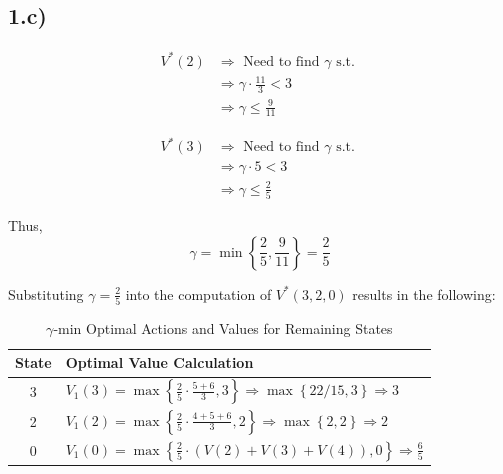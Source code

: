 \documentclass[11pt]{article}
\begin{document}
\subsection*{1.c)}

\begin{align*}
V^*(2) &\Rightarrow \text{ Need to find } \gamma \text{ s.t. } \\
& \Rightarrow \gamma \cdot \frac{11}{3} < 3 \\
&\Rightarrow \gamma \leq \frac{9}{11}
\end{align*}

\vspace{1em}

\begin{align*}
V^*(3) &\Rightarrow \text{ Need to find } \gamma \text{ s.t. } \\
&\Rightarrow \gamma \cdot 5 < 3 \\
&\Rightarrow \gamma \leq \frac{2}{5}
\end{align*}

Thus,
\[
\gamma = \min\left\{\frac{2}{5}, \frac{9}{11}\right\} = \frac{2}{5}
\]

Substituting \(\gamma = \frac{2}{5}\) into the computation of \(V^*(3,2,0)\) results in the following:

\begin{table}[h]
\centering
\renewcommand{\arraystretch}{1.5} %
\caption{$\gamma$-min Optimal Actions and Values for Remaining States}
\label{tab:lambda_min_optimal_values}
\vspace{1em}

\begin{tabular}{c|l}
\hline
\textbf{State} & \textbf{Optimal Value Calculation} \\
\hline

3 &
$V_1(3) = \max \left\{ \frac{2}{5} \cdot \frac{5+6}{3}, 3 \right\}
\Rightarrow \max \left\{ 22/15 , 3  \right\}
\Rightarrow 3$ \\
\hline

2 &
$V_1(2) = \max \left\{ \frac{2}{5} \cdot \frac{4+5+6}{3}, 2 \right\}
\Rightarrow \max \left\{ 2 , 2  \right\}
\Rightarrow 2$ \\

\hline

0 &
$V_1(0) = \max \left\{ \frac{2}{5} \cdot (V(2) + V(3) +  V(4)) , 0  \right\} \Rightarrow \frac{6}{5}$ \\
\hline
\end{tabular}
\end{table}
\end{document}
